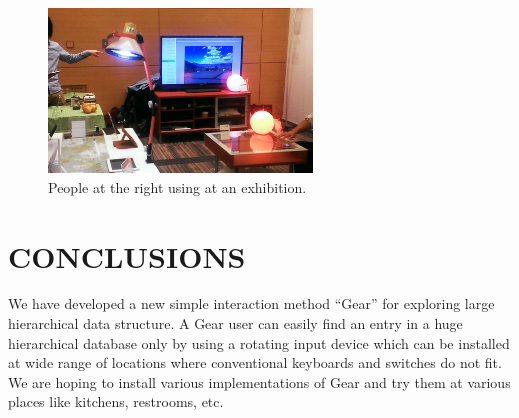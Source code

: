 \documentclass{article}
\def\SC{\tsf{Serencast}}
\begin{document}
\begin{figure}[H]
\centerline{\includegraphics[width=70mm,bb=0 0 527 329]{figures/c520d5dfbd06c532d48d324a7019b00c.png}}
\caption{People at the right using {\SC} at an exhibition.}
\label{exhibition}
\end{figure}


\section*{CONCLUSIONS}

We have developed a new simple interaction method ``Gear'' for exploring
large hierarchical data structure.
A Gear user can easily find an entry in a huge hierarchical database
only by using a rotating input device which can be installed at
wide range of locations where conventional keyboards and switches do not fit.
We are hoping to install various implementations of Gear and try them at
various places like kitchens, restrooms, etc.

\small{


}
\end{document}
